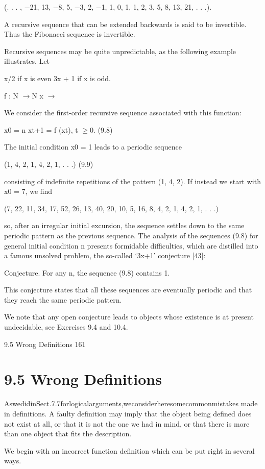 \documentclass[11pt]{article}
\theoremstyle{plain}
\theoremstyle{definition}
\begin{document}
(. . . , $-$21, 13, $-$8, 5, $-$3, 2, $-$1, 1, 0, 1, 1, 2, 3, 5, 8, 13, 21, . . .).

A recursive sequence that can be extended backwards is said to be invertible. Thus the Fibonacci sequence is invertible.

Recursive sequences may be quite unpredictable, as the following example illustrates. Let

x/2 if x is even 3x + 1 if x is odd.

f : N $\to$N x $\to$

We consider the first-order recursive sequence associated with this function:

x0 = n xt+1 = f (xt), t $\geq$0. (9.8)

The initial condition x0 = 1 leads to a periodic sequence

(1, 4, 2, 1, 4, 2, 1, . . .) (9.9)

consisting of indefinite repetitions of the pattern (1, 4, 2). If instead we start with x0 = 7, we find

(7, 22, 11, 34, 17, 52, 26, 13, 40, 20, 10, 5, 16, 8, 4, 2, 1, 4, 2, 1, . . .)

so, after an irregular initial excursion, the sequence settles down to the same periodic pattern as the previous sequence. The analysis of the sequences (9.8) for general initial condition n presents formidable difficulties, which are distilled into a famous unsolved problem, the so-called `3x+1' conjecture [43]:

Conjecture. For any n, the sequence (9.8) contains 1.

This conjecture states that all these sequences are eventually periodic and that they reach the same periodic pattern.

We note that any open conjecture leads to objects whose existence is at present undecidable, see Exercises 9.4 and 10.4.

9.5 Wrong Definitions 161

\section{9.5 Wrong Definitions}

AswedidinSect.7.7forlogicalarguments,weconsiderheresomecommonmistakes made in definitions. A faulty definition may imply that the object being defined does not exist at all, or that it is not the one we had in mind, or that there is more than one object that fits the description.

We begin with an incorrect function definition which can be put right in several ways.
\end{document}
